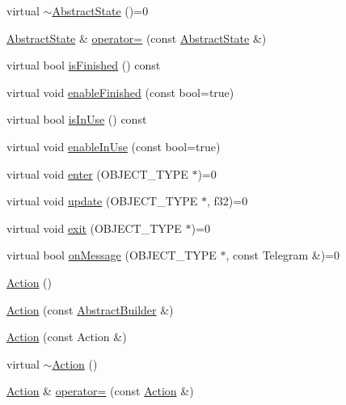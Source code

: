 \begin{DoxyCompactItemize}
\item 
virtual \hyperlink{namespacejli_a4f29ddbfb1999ccb9059334002f37aaf}{$\sim$\+Abstract\+State} ()=0
\item 
\hyperlink{namespacejli_afb90c6843a57abb6648df522fd034666}{Abstract\+State} \& \hyperlink{namespacejli_a11ea974b98a56570306c45017bb5fcf4}{operator=} (const \hyperlink{namespacejli_afb90c6843a57abb6648df522fd034666}{Abstract\+State} \&)
\item 
virtual bool \hyperlink{namespacejli_a03fa79fbaafd83709515e1115c5a3986}{is\+Finished} () const 
\item 
virtual void \hyperlink{namespacejli_abe513ad11f4f190e62b972f4f8893aea}{enable\+Finished} (const bool=true)
\item 
virtual bool \hyperlink{namespacejli_ac98ddd4e4925a857a8935b40178b2718}{is\+In\+Use} () const 
\item 
virtual void \hyperlink{namespacejli_a28a9fe0627a5e67e2e4a15a3663f7bc4}{enable\+In\+Use} (const bool=true)
\item 
virtual void \hyperlink{namespacejli_aaa622c9ff88b18070c8c1c970b4a26f8}{enter} (O\+B\+J\+E\+C\+T\+\_\+\+T\+Y\+P\+E $\ast$)=0
\item 
virtual void \hyperlink{namespacejli_a922c317a977284f6b6e24ed5c655dd12}{update} (O\+B\+J\+E\+C\+T\+\_\+\+T\+Y\+P\+E $\ast$, f32)=0
\item 
virtual void \hyperlink{namespacejli_ad265e81449125b1850fe3a2874dae6f6}{exit} (O\+B\+J\+E\+C\+T\+\_\+\+T\+Y\+P\+E $\ast$)=0
\item 
virtual bool \hyperlink{namespacejli_ad9966e101b766e590473468c68125124}{on\+Message} (O\+B\+J\+E\+C\+T\+\_\+\+T\+Y\+P\+E $\ast$, const Telegram \&)=0
\item 
\hyperlink{namespacejli_ac1d6edc4f796157e771fb531302807c5}{Action} ()
\item 
\hyperlink{namespacejli_a372d9d21f05940e5e2e7728e51e5497e}{Action} (const \hyperlink{classjli_1_1_abstract_builder}{Abstract\+Builder} \&)
\item 
\hyperlink{namespacejli_a56537e2852192599346977eae126cf3f}{Action} (const Action \&)
\item 
virtual \hyperlink{namespacejli_a366502b547b6ed3de30f23020a65df04}{$\sim$\+Action} ()
\item 
\hyperlink{namespacejli_ac1d6edc4f796157e771fb531302807c5}{Action} \& \hyperlink{namespacejli_a3652a77b1603e782ad8ac9ff69eb0f83}{operator=} (const \hyperlink{namespacejli_ac1d6edc4f796157e771fb531302807c5}{Action} \&)
\item 

\end{DoxyCompactItemize}
